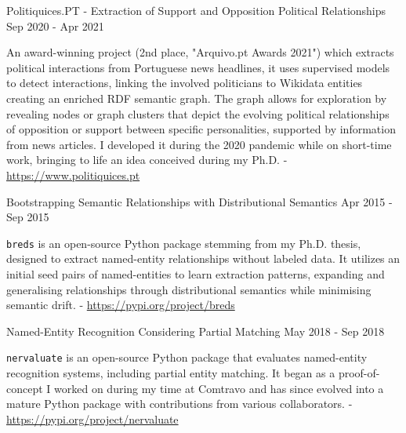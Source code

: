 

\begin{cventries}
  \cvproject
    {} %
	{Politiquices.PT - Extraction of Support and Opposition Political Relationships} %
    {} %
    {Sep 2020 - Apr 2021} %
    {
      \begin{cvitems} %
		  \item{An award-winning project (2nd place, "Arquivo.pt Awards 2021") which extracts political interactions from Portuguese news headlines, it uses supervised models to detect interactions, linking the involved politicians to Wikidata entities creating an enriched RDF semantic graph. The graph allows for exploration by revealing nodes or graph clusters that depict the evolving political relationships of opposition or support between specific personalities, supported by information from news articles. I developed it during the 2020 pandemic while on short-time work, bringing to life an idea conceived during my Ph.D. - \url{https://www.politiquices.pt}}
      \end{cvitems}
    }
\end{cventries}




\begin{cventries}
 \cvproject
   {} %
   {Bootstrapping Semantic Relationships with Distributional Semantics} %
   {} %
   {Apr 2015 - Sep 2015} %
   {
     \begin{cvitems} %
		\item {\texttt{breds} is an open-source Python package stemming from my Ph.D. thesis, designed to extract named-entity relationships without labeled data. It utilizes an initial seed pairs of named-entities to learn extraction patterns, expanding and generalising relationships through distributional semantics while minimising semantic drift. - \url{https://pypi.org/project/breds}}
     \end{cvitems}
   }
\end{cventries}

\begin{cventries}
 \cvproject
   {} %
   {Named-Entity Recognition Considering Partial Matching} %
   {} %
   {May 2018 - Sep 2018} %
   {
     \begin{cvitems} %
     	\item {\texttt{nervaluate} is an open-source Python package that evaluates named-entity recognition systems, including partial entity matching. It began as a proof-of-concept I worked on during my time at Comtravo and has since evolved into a mature Python package with contributions from various collaborators. - \url{https://pypi.org/project/nervaluate}}
     \end{cvitems}
   }
\end{cventries}
